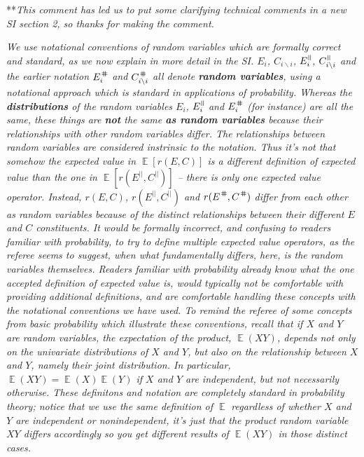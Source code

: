 \documentclass[letterpaper,11pt]{article}
\DeclareMathOperator{\E}{\mathbb{E}}%
\newcommand{\nat}{%
\text{\hspace{-1.5pt}
\begin{tikzpicture}[scale=1.8]%
\draw (.333ex,0) -- (.333ex,1ex);%
\draw (.666ex,0) -- (.666ex,1ex);
\end{tikzpicture}%
}}
\newcommand{\shp}{%
\text{\hspace{-1.5pt}
\begin{tikzpicture}[scale=1.8]%
\draw (0,.333ex) -- (1ex,.333ex);%
\draw (0,.666ex) -- (1ex,.666ex);%
\draw (.333ex,0) -- (.333ex,1ex);%
\draw (.666ex,0) -- (.666ex,1ex);
\end{tikzpicture}%
}}
\newcommand{\bs}{\backslash}
\begin{document}
\noindent ***\emph{This comment has led us to put some clarifying technical comments in a new SI section 2,
so thanks for making the comment.} 

\emph{We use notational conventions of random variables which are formally correct and standard, 
as we now explain in more detail in the SI. 
$E_i$, $C_{i \bs i}$, $E_i^{\nat}$, $C_{i \bs i}^\nat$ and the earlier 
notation $E_i^\shp$ and $C_{i \bs i}^\shp$ all denote \textbf{random variables}, using a 
notational approach which is standard in applications of probability. 
Whereas the \textbf{distributions} of the random variables $E_i$, $E_i^{\nat}$ and $E_i^\shp$ (for instance) are all the same,
these things are \textbf{not} the same \textbf{as random variables} because their relationships with other random variables 
differ. The relationships between random variables are considered instrinsic
to the notation. Thus it's not that somehow the expected value in $\E[r(E,C)]$ is a different definition of expected
value than the one in $\E[r(E^{||},C^{||})]$ -- there is only one expected value operator. 
Instead, $r(E,C)$, $r(E^{||},C^{||})$ and $r(E^\shp,C^\shp)$ differ from each other 
as random variables because of the distinct relationships between their
different $E$ and $C$ constituents. It would be formally 
incorrect, and confusing to readers familiar with probability, to try to define multiple expected value 
operators, as the referee seems to suggest, when what fundamentally differs, here, is the random variables 
themselves. Readers familiar with
probability already know what the one accepted definition of expected value is, would typically
not be comfortable with providing additional definitions, and are comfortable handling these concepts
with the notational conventions we have used. To remind the referee of some concepts from basic probability
which illustrate these conventions, recall that if $X$ and $Y$ are random variables, the expectation of the 
product, $\E(XY)$, depends not only on the univariate distributions of $X$ and $Y$, but also on the relationship
between $X$ and $Y$, namely their joint distribution. In particular, $\E(XY)=\E(X)\E(Y)$ if $X$ and 
$Y$ are independent, but not necessarily otherwise. These definitons and notation are completely 
standard in probability theory; notice that we use the same definition of $\E$ regardless of 
whether $X$ and $Y$ are independent or nonindependent, it's just that the product random variable
$XY$ differs accordingly so you get different results of $\E(XY)$ in those distinct cases.}
\end{document}
